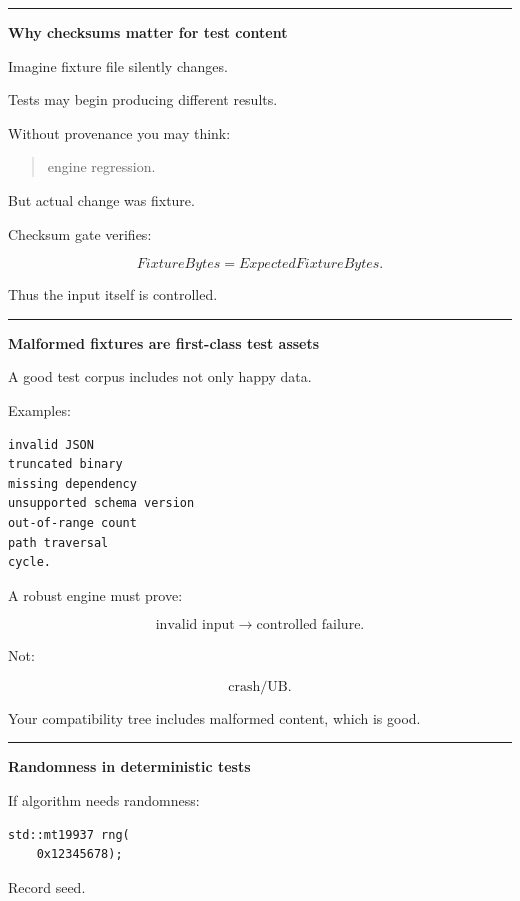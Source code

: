 \begin{center}\rule{0.5\linewidth}{0.5pt}\end{center}

\textbf{Why checksums matter for test content}

Imagine fixture file silently changes.

Tests may begin producing different results.

Without provenance you may think:

\begin{quote}
engine regression.
\end{quote}

But actual change was fixture.

Checksum gate verifies:

\[
FixtureBytes=
ExpectedFixtureBytes.
\]

Thus the input itself is controlled.

\begin{center}\rule{0.5\linewidth}{0.5pt}\end{center}

\textbf{Malformed fixtures are first-class test assets}

A good test corpus includes not only happy data.

Examples:

\begin{verbatim}
invalid JSON
truncated binary
missing dependency
unsupported schema version
out-of-range count
path traversal
cycle.
\end{verbatim}

A robust engine must prove:

\[
\text{invalid input}
\rightarrow
\text{controlled failure}.
\]

Not:

\[
\text{crash/UB}.
\]

Your compatibility tree includes malformed content, which is good.

\begin{center}\rule{0.5\linewidth}{0.5pt}\end{center}

\textbf{Randomness in deterministic tests}

If algorithm needs randomness:

\begin{verbatim}
std::mt19937 rng(
    0x12345678);
\end{verbatim}

Record seed.

